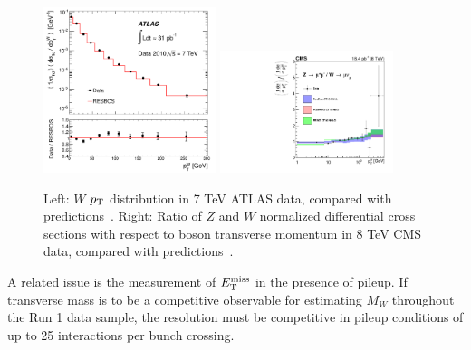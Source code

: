 \begin{figure}[p]
    \centering
    \includegraphics[width=0.45\textwidth]{figures/ss-precision-wmass-wpt-atlas.pdf}
    \includegraphics[width=0.45\textwidth]{figures/ss-precision-wmass-wzptratio-cms.pdf}
    \caption{
    Left: $W$ $p_{\mathrm{T}}$ distribution in 7 TeV ATLAS data, compared with predictions~\cite{Aad:2011fp}.
    Right:  Ratio of $Z$ and $W$ normalized differential cross sections with respect to boson transverse momentum in 8 TeV CMS data, compared with predictions~\cite{Khachatryan:2016nbe}. 
}  
    \label{fig:ss-precision-wmass-wpt}
\end{figure}

A related issue is the measurement of $E_{\mathrm{T}}^{\mathrm{miss}}$ in the presence of
pileup.  If transverse mass is to be a competitive observable for
estimating $M_W$ throughout the Run 1 data sample, the resolution must
be competitive in pileup conditions of up to 25 interactions per bunch
crossing.  






